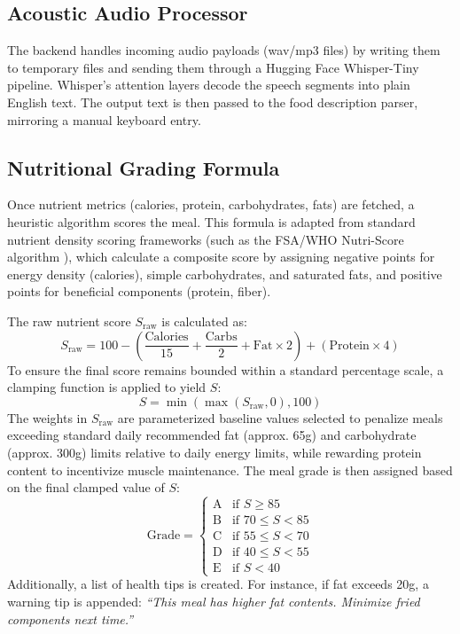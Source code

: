\documentclass[12pt,a4paper,oneside]{report}
\begin{document}
\subsection{Acoustic Audio Processor}
The backend handles incoming audio payloads (wav/mp3 files) by writing them to temporary files and sending them through a Hugging Face Whisper-Tiny pipeline. Whisper's attention layers decode the speech segments into plain English text. The output text is then passed to the food description parser, mirroring a manual keyboard entry.

\subsection{Nutritional Grading Formula}
Once nutrient metrics (calories, protein, carbohydrates, fats) are fetched, a heuristic algorithm scores the meal. This formula is adapted from standard nutrient density scoring frameworks (such as the FSA/WHO Nutri-Score algorithm \cite{chazelas2020nutri}), which calculate a composite score by assigning negative points for energy density (calories), simple carbohydrates, and saturated fats, and positive points for beneficial components (protein, fiber). 

The raw nutrient score $S_{\text{raw}}$ is calculated as:
\begin{equation}
    S_{\text{raw}} = 100 - \left( \frac{\text{Calories}}{15} + \frac{\text{Carbs}}{2} + \text{Fat} \times 2 \right) + (\text{Protein} \times 4)
\end{equation}
To ensure the final score remains bounded within a standard percentage scale, a clamping function is applied to yield $S$:
\begin{equation}
    S = \min\left(\max\left(S_{\text{raw}}, 0\right), 100\right)
\end{equation}
The weights in $S_{\text{raw}}$ are parameterized baseline values selected to penalize meals exceeding standard daily recommended fat (approx. 65g) and carbohydrate (approx. 300g) limits relative to daily energy limits, while rewarding protein content to incentivize muscle maintenance. The meal grade is then assigned based on the final clamped value of $S$:
\begin{equation}
    \text{Grade} = \begin{cases}
        \text{A} & \text{if } S \ge 85 \\
        \text{B} & \text{if } 70 \le S < 85 \\
        \text{C} & \text{if } 55 \le S < 70 \\
        \text{D} & \text{if } 40 \le S < 55 \\
        \text{E} & \text{if } S < 40
    \end{cases}
\end{equation}
Additionally, a list of health tips is created. For instance, if fat exceeds 20g, a warning tip is appended: \textit{``This meal has higher fat contents. Minimize fried components next time.''}
\end{document}
